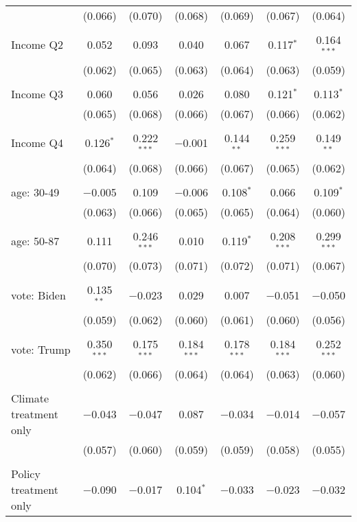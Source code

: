 \begin{tabular}{@{\extracolsep{5pt}}lcccccc}
  & (0.066) & (0.070) & (0.068) & (0.069) & (0.067) & (0.064) \\ 
  & & & & & & \\ 
 Income Q2 & 0.052 & 0.093 & 0.040 & 0.067 & 0.117$^{*}$ & 0.164$^{***}$ \\ 
  & (0.062) & (0.065) & (0.063) & (0.064) & (0.063) & (0.059) \\ 
  & & & & & & \\ 
 Income Q3 & 0.060 & 0.056 & 0.026 & 0.080 & 0.121$^{*}$ & 0.113$^{*}$ \\ 
  & (0.065) & (0.068) & (0.066) & (0.067) & (0.066) & (0.062) \\ 
  & & & & & & \\ 
 Income Q4 & 0.126$^{*}$ & 0.222$^{***}$ & $-$0.001 & 0.144$^{**}$ & 0.259$^{***}$ & 0.149$^{**}$ \\ 
  & (0.064) & (0.068) & (0.066) & (0.067) & (0.065) & (0.062) \\ 
  & & & & & & \\ 
 age: 30-49 & $-$0.005 & 0.109 & $-$0.006 & 0.108$^{*}$ & 0.066 & 0.109$^{*}$ \\ 
  & (0.063) & (0.066) & (0.065) & (0.065) & (0.064) & (0.060) \\ 
  & & & & & & \\ 
 age: 50-87 & 0.111 & 0.246$^{***}$ & 0.010 & 0.119$^{*}$ & 0.208$^{***}$ & 0.299$^{***}$ \\ 
  & (0.070) & (0.073) & (0.071) & (0.072) & (0.071) & (0.067) \\ 
  & & & & & & \\ 
 vote: Biden & 0.135$^{**}$ & $-$0.023 & 0.029 & 0.007 & $-$0.051 & $-$0.050 \\ 
  & (0.059) & (0.062) & (0.060) & (0.061) & (0.060) & (0.056) \\ 
  & & & & & & \\ 
 vote: Trump & 0.350$^{***}$ & 0.175$^{***}$ & 0.184$^{***}$ & 0.178$^{***}$ & 0.184$^{***}$ & 0.252$^{***}$ \\ 
  & (0.062) & (0.066) & (0.064) & (0.064) & (0.063) & (0.060) \\ 
  & & & & & & \\ 
 Climate treatment only & $-$0.043 & $-$0.047 & 0.087 & $-$0.034 & $-$0.014 & $-$0.057 \\ 
  & (0.057) & (0.060) & (0.059) & (0.059) & (0.058) & (0.055) \\ 
  & & & & & & \\ 
 Policy treatment only & $-$0.090 & $-$0.017 & 0.104$^{*}$ & $-$0.033 & $-$0.023 & $-$0.032 \\ 

\end{tabular}
